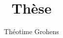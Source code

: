 \documentclass[a4paper,twoside,11pt]{memoir}
\begin{document}
\author{Théotime Grohens}
\title{Thèse}

\maketitle
\thispagestyle{empty}
\pagebreak

\frontmatter



\tableofcontents
\listoffigures
\listoftables

\mainmatter





\appendix



\backmatter



\end{document}
